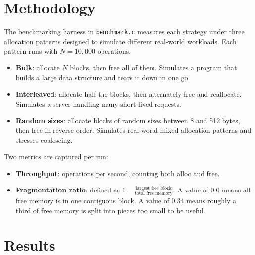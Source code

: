\documentclass[12pt, a4paper]{report}
\begin{document}
\section{Methodology}

The benchmarking harness in \texttt{benchmark.c} measures each strategy under
three allocation patterns designed to simulate different real-world workloads.
Each pattern runs with $N = 10{,}000$ operations.

\begin{itemize}
  \item \textbf{Bulk}: allocate $N$ blocks, then free all of them. Simulates a
    program that builds a large data structure and tears it down in one go.
  \item \textbf{Interleaved}: allocate half the blocks, then alternately free
    and reallocate. Simulates a server handling many short-lived requests.
  \item \textbf{Random sizes}: allocate blocks of random sizes between 8 and 512
    bytes, then free in reverse order. Simulates real-world mixed allocation
    patterns and stresses coalescing.
\end{itemize}

Two metrics are captured per run:

\begin{itemize}
  \item \textbf{Throughput}: operations per second, counting both alloc and free.
  \item \textbf{Fragmentation ratio}: defined as $1 - \frac{\text{largest free block}}{\text{total free memory}}$.
    A value of 0.0 means all free memory is in one contiguous block. A value of
    0.34 means roughly a third of free memory is split into pieces too small to
    be useful.
\end{itemize}

\section{Results}
\end{document}
